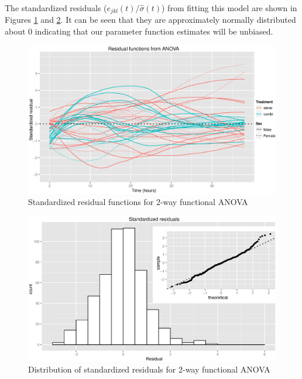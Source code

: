 The standardized residuals ($e_{jkl}(t)/\hat{\sigma}(t)$) from fitting this model are shown in Figures \ref{fdaresids} and \ref{fdahistqq}. It can be seen that they are approximately normally distributed about 0 indicating that our parameter function estimates will be unbiased.
\begin{figure}[p]
\includegraphics[width=150mm]{fdaresids.eps} 
\caption{Standardized residual functions for 2-way functional ANOVA}
\label{fdaresids}
\end{figure}
\begin{figure}[p]
\includegraphics[width=150mm]{fdahistqq.eps} 
\caption{Distribution of standardized residuals for 2-way functional ANOVA}
\label{fdahistqq}
\end{figure}

